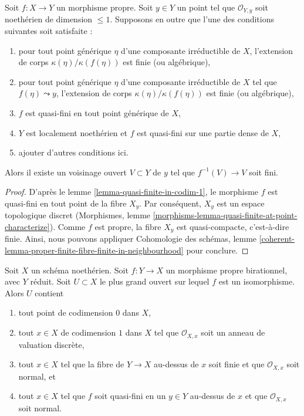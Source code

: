 \begin{lemma}
\label{lemma-finite-in-codim-1}
Soit $f : X \to Y$ un morphisme propre. Soit $y \in Y$
un point tel que $\mathcal{O}_{Y, y}$ soit noethérien de dimension
$\leq 1$. Supposons en outre que l'une des conditions suivantes soit satisfaite :
\begin{enumerate}
\item pour tout point générique $\eta$ d'une composante irréductible
de $X$, l'extension de corps $\kappa(\eta)/\kappa(f(\eta))$
est finie (ou algébrique),
\item pour tout point générique $\eta$ d'une composante irréductible
de $X$ tel que $f(\eta) \leadsto y$, l'extension de corps
$\kappa(\eta)/\kappa(f(\eta))$ est finie (ou algébrique),
\item $f$ est quasi-fini en tout point générique de $X$,
\item $Y$ est localement noethérien et $f$ est quasi-fini
sur une partie dense de $X$,
\item ajouter d'autres conditions ici.
\end{enumerate}
Alors il existe un voisinage ouvert $V \subset
Y$ de $y$ tel que $f^{-1}(V) \to V$ soit fini.
\end{lemma}

\begin{proof}
D'après le lemme \ref{lemma-quasi-finite-in-codim-1}, le
morphisme $f$ est quasi-fini en tout point de la fibre
$X_y$. Par conséquent, $X_y$ est un espace topologique
discret (Morphismes, lemme
\ref{morphisms-lemma-quasi-finite-at-point-characterize}). Comme $f$
est propre, la fibre $X_y$ est quasi-compacte, c'est-à-dire finie.
Ainsi, nous pouvons appliquer Cohomologie des schémas, lemme
\ref{coherent-lemma-proper-finite-fibre-finite-in-neighbourhood} pour conclure.
\end{proof}

\begin{lemma}
\label{lemma-modification-normal-iso-over-codimension-1}
Soit $X$ un schéma noethérien. Soit $f : Y \to X$ un
morphisme propre birationnel, avec $Y$ réduit. Soit $U \subset
X$ le plus grand ouvert sur lequel $f$ est un isomorphisme. Alors $U$ contient
\begin{enumerate}
\item tout point de codimension $0$ dans $X$,
\item tout $x \in X$ de codimension $1$ dans $X$ tel que
$\mathcal{O}_{X, x}$ soit un anneau de valuation discrète,
\item tout $x \in X$ tel que la fibre de $Y \to X$ au-dessus
de $x$ soit finie et que $\mathcal{O}_{X, x}$ soit normal, et
\item tout $x \in X$ tel que $f$ soit quasi-fini en un
$y \in Y$ au-dessus de $x$ et que $\mathcal{O}_{X, x}$ soit normal.
\end{enumerate}
\end{lemma}

